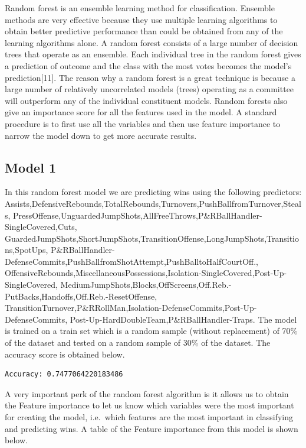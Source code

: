 \documentclass[]{book}
\begin{document}
Random forest is an ensemble learning method for classification. Ensemble methods are very effective because they use multiple learning algorithms to obtain better predictive performance than could be obtained from any of the learning algorithms alone.
A random forest consists of a large number of decision trees that operate as an ensemble. Each individual tree in the random forest gives a prediction of outcome and the class with the most votes becomes the model's prediction{[}11{]}.
The reason why a random forest is a great technique is because a large number of relatively uncorrelated models (trees) operating as a committee will outperform any of the individual constituent models.
Random forests also give an importance score for all the features used in the model. A standard procedure is to first use all the variables and then use feature importance to narrow the model down to get more accurate results.

\hypertarget{model-1}{%
\subsection{Model 1}\label{model-1}}

In this random forest model we are predicting wins using the following predictors: Assists,DefensiveRebounds,TotalRebounds,Turnovers,PushBallfromTurnover,Steals,
PressOffense,UnguardedJumpShots,AllFreeThrows,P\&RBallHandler-SingleCovered,Cuts,
GuardedJumpShots,ShortJumpShots,TransitionOffense,LongJumpShots,Transitions,SpotUps,
P\&RBallHandler-DefenseCommits,PushBallfromShotAttempt,PushBalltoHalfCourtOff.,
OffensiveRebounds,MiscellaneousPossessions,Isolation-SingleCovered,Post-Up-SingleCovered,
MediumJumpShots,Blocks,OffScreens,Off.Reb.-PutBacks,Handoffs,Off.Reb.-ResetOffense,
TransitionTurnover,P\&RRollMan,Isolation-DefenseCommits,Post-Up-DefenseCommits,
Post-Up-HardDoubleTeam,P\&RBallHandler-Traps. The model is trained on a train set which is a random sample (without replacement) of 70\% of the dataset and tested on a random sample of 30\% of the dataset. The accuracy score is obtained below.

\begin{verbatim}
Accuracy: 0.7477064220183486
\end{verbatim}

A very important perk of the random forest algorithm is it allows us to obtain the Feature importance to let us know which variables were the most important for creating the model, i.e.~which features are the most important in classifying and predicting wins. A table of the Feature importance from this model is shown below.
\end{document}
